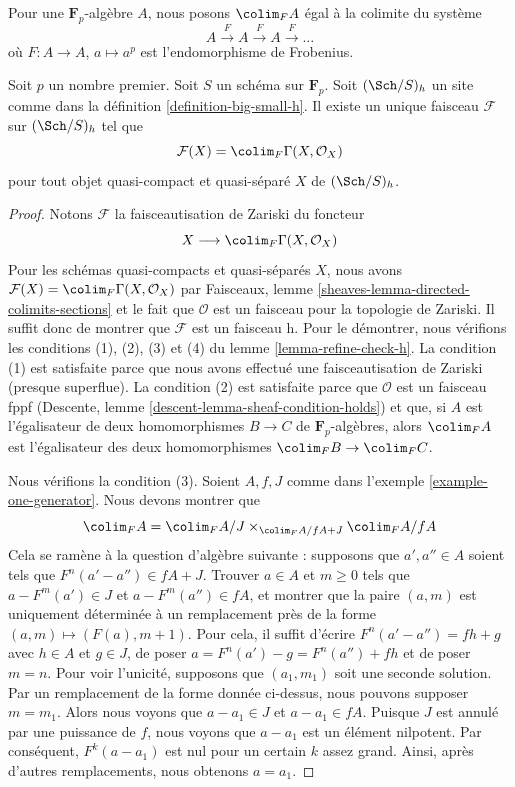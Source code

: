 \noindent
Pour une $\mathbf{F}_p$-algèbre $A$,
nous posons $\colim_F A$ égal à la colimite du système
$$
A \xrightarrow{F} A \xrightarrow{F} A \xrightarrow{F} \ldots
$$
où $F : A \to A$, $a \mapsto a^p$ est l'endomorphisme de Frobenius.

\begin{lemma}
\label{lemma-h-sheaf-colim-F}
Soit $p$ un nombre premier. Soit $S$ un schéma sur $\mathbf{F}_p$.
Soit $(\Sch/S)_h$ un site comme dans la définition \ref{definition-big-small-h}.
Il existe un unique faisceau $\mathcal{F}$ sur $(\Sch/S)_h$ tel que
$$
\mathcal{F}(X) = \colim_F \Gamma(X, \mathcal{O}_X)
$$
pour tout objet quasi-compact et quasi-séparé $X$ de $(\Sch/S)_h$.
\end{lemma}

\begin{proof}
Notons $\mathcal{F}$ la faisceautisation de Zariski
du foncteur
$$
X \longrightarrow \colim_F \Gamma(X, \mathcal{O}_X)
$$
Pour les schémas quasi-compacts et quasi-séparés $X$,
nous avons\newline $\mathcal{F}(X) = \colim_F \Gamma(X, \mathcal{O}_X)$
par Faisceaux, lemme \ref{sheaves-lemma-directed-colimits-sections}
et le fait que $\mathcal{O}$ est un faisceau pour la topologie de Zariski.
Il suffit donc de montrer que $\mathcal{F}$ est un faisceau h.
Pour le démontrer, nous vérifions les conditions (1), (2), (3) et (4) du
lemme \ref{lemma-refine-check-h}.
La condition (1) est satisfaite parce que nous avons effectué une faisceautisation
de Zariski (presque superflue). La condition (2) est satisfaite parce que
$\mathcal{O}$ est un faisceau fppf (Descente, lemme
\ref{descent-lemma-sheaf-condition-holds}) et que, si
$A$ est l'égalisateur de deux homomorphismes $B \to C$ de $\mathbf{F}_p$-algèbres,
alors $\colim_F A$ est l'égalisateur des deux homomorphismes
$\colim_F B \to \colim_F C$.

\medskip\noindent
Nous vérifions la condition (3). Soient $A, f, J$ comme dans
l'exemple \ref{example-one-generator}.
Nous devons montrer que
$$
\colim_F A = \colim_F A/J \times_{\colim_F A/fA + J} \colim_F A/fA
$$
Cela se ramène à la question d'algèbre suivante : supposons que $a', a'' \in A$
soient tels que $F^n(a' - a'') \in fA + J$. Trouver $a \in A$ et $m \geq 0$
tels que $a - F^m(a') \in J$ et $a - F^m(a'') \in fA$, et montrer que
la paire $(a, m)$ est uniquement déterminée à un remplacement près de la
forme $(a, m) \mapsto (F(a), m + 1)$.
Pour cela, il suffit d'écrire $F^n(a' - a'') = f h + g$ avec $h \in A$ et $g \in J$,
de poser $a = F^n(a') - g = F^n(a'') + fh$ et de poser $m = n$.
Pour voir l'unicité, supposons que $(a_1, m_1)$ soit une seconde solution.
Par un remplacement de la forme donnée ci-dessus, nous pouvons supposer $m = m_1$.
Alors nous voyons que $a - a_1 \in J$ et $a - a_1 \in fA$.
Puisque $J$ est annulé par une puissance de $f$, nous voyons que
$a - a_1$ est un élément nilpotent. Par conséquent, $F^k(a - a_1)$ est nul
pour un certain $k$ assez grand. Ainsi, après d'autres remplacements, nous obtenons
$a = a_1$.


\end{proof}
